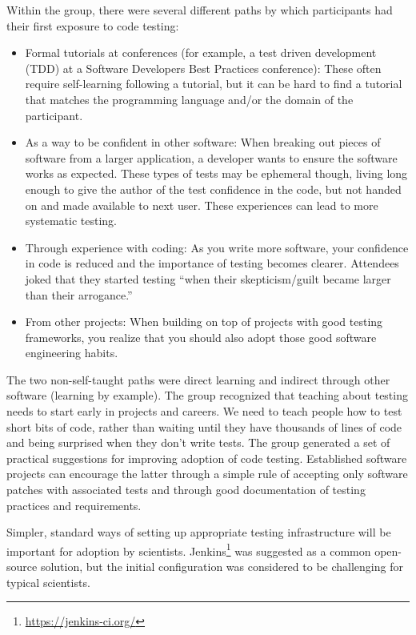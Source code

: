 \documentclass[11pt, oneside]{amsart}
\begin{document}
Within the group, there were several different paths by which participants had their 
first exposure to code testing:
\begin{itemize}

\item Formal tutorials at conferences (for example, a test driven development
(TDD) at a Software Developers Best Practices conference): These often require
self-learning following a tutorial, but it can be hard to find a tutorial that
matches the programming language and/or the domain of the participant.

\item As a way to be confident in other software: When breaking out pieces of
software from a larger application, a developer wants to ensure the software
works as expected. These types of tests may be ephemeral though, living long
enough to give the author of the test confidence in the code, but not handed on
and made available to next user. These experiences can lead to more systematic
testing.

\item Through experience with coding: As you write more software, your
confidence in code is reduced and the importance of testing becomes clearer.
Attendees joked that they started testing ``when their skepticism/guilt became
larger than their arrogance.''

\item From other projects: When building on top of projects with good testing
frameworks, you realize that you should also adopt those good software
engineering habits.

\end{itemize}

The two non-self-taught paths were direct learning and indirect through other
software (learning by example). The group recognized that teaching about testing
needs to start early in projects and careers. We need to teach people how to
test short bits of code, rather than waiting until they have thousands of lines
of code and being surprised when they don't write tests. The group generated a
set of practical suggestions for improving adoption of code testing.
%
Established software projects can encourage the latter through a simple rule of
accepting only software patches with associated tests and through good
documentation of testing practices and requirements.

Simpler, standard ways of setting up appropriate testing infrastructure will be
important for adoption by scientists. Jenkins\footnote{\url{https://jenkins-ci.org/}} 
was suggested as a common open-source
solution, but the initial configuration was considered to be challenging for
typical scientists.
\end{document}
